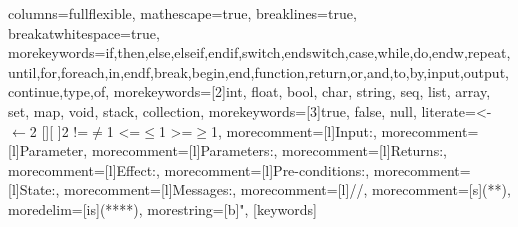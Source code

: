 \usepackage{listings}
%
  {%
   columns=fullflexible,
   mathescape=true,
   breaklines=true,
   breakatwhitespace=true,
   morekeywords={if,then,else,elseif,endif,switch,endswitch,case,while,do,endw,repeat,until,for,foreach,in,endf,break,begin,end,function,return,or,and,to,by,input,output,continue,type,of},
   morekeywords=[2]{int, float, bool, char, string, seq, list, array, set, map, void, stack, collection},
   morekeywords=[3]{true, false, null},
   literate={<-}{{${}\leftarrow{}$}}{2} {[]}{[ ]}{2} {!=}{{${}\not={}$}}{1} {<=}{${}\leq{}$}{1} {>=}{${}\geq{}$}{1},
   morecomment=[l]{Input:},
   morecomment=[l]{Parameter},
   morecomment=[l]{Parameters:},
   morecomment=[l]{Returns:},
   morecomment=[l]{Effect:},
   morecomment=[l]{Pre-conditions:},
   morecomment=[l]{State:},
   morecomment=[l]{Messages:},
   morecomment=[l]{//},
   morecomment=[s]{(*}{*)},
   moredelim=[is]{(**}{**)},
   morestring=[b]",
  }
  [keywords]

